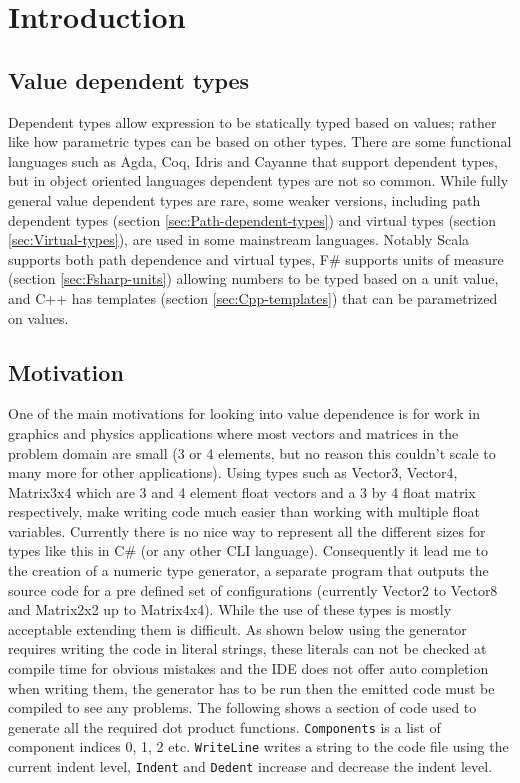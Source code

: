 \documentclass[english]{report}
\begin{document}
\chapter{Introduction}

\section{Value dependent types}

Dependent types allow expression to be statically typed based on values;
rather like how parametric types can be based on other types. There
are some functional languages such as Agda\cite{agda}, Coq\cite{coq},
Idris\cite{idris} and Cayanne\cite{cayenne} that support dependent
types, but in object oriented languages dependent types are not so
common. While fully general value dependent types are rare, some weaker
versions, including path dependent types (section \ref{sec:Path-dependent-types})
and virtual types (section \ref{sec:Virtual-types}), are used in
some mainstream languages. Notably Scala\cite{scala} supports both
path dependence and virtual types, F\#\cite{fsharp} supports units
of measure (section \ref{sec:Fsharp-units}) allowing numbers to be
typed based on a unit value, and C++ has templates (section \ref{sec:Cpp-templates})
that can be parametrized on values.


\section{Motivation}

One of the main motivations for looking into value dependence is for
work in graphics and physics applications where most vectors and matrices
in the problem domain are small (3 or 4 elements, but no reason this
couldn't scale to many more for other applications). Using types such
as Vector3, Vector4, Matrix3x4 which are 3 and 4 element float vectors
and a 3 by 4 float matrix respectively, make writing code much easier
than working with multiple float variables. Currently there is no
nice way to represent all the different sizes for types like this
in C\# (or any other CLI language). Consequently it lead me to the
creation of a numeric type generator, a separate program that outputs
the source code for a pre defined set of configurations (currently
Vector2 to Vector8 and Matrix2x2 up to Matrix4x4). While the use of
these types is mostly acceptable extending them is difficult. As shown
below using the generator requires writing the code in literal strings,
these literals can not be checked at compile time for obvious mistakes
and the IDE does not offer auto completion when writing them, the
generator has to be run then the emitted code must be compiled to
see any problems. The following shows a section of code used to generate
all the required dot product functions. \texttt{Components} is a list
of component indices 0, 1, 2 etc. \texttt{WriteLine} writes a string
to the code file using the current indent level, \texttt{Indent} and
\texttt{Dedent} increase and decrease the indent level.
\end{document}
